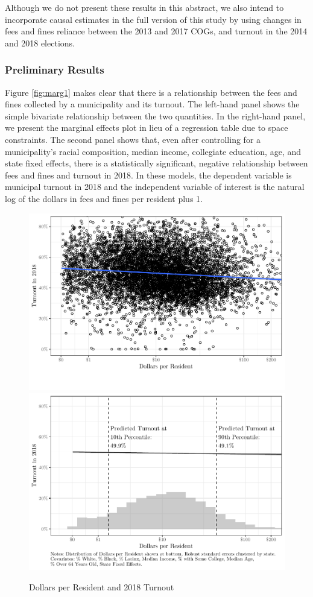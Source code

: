 \documentclass[
  12pt,
]{article}
\begin{document}
Although we do not present these results in this abstract, we also intend to incorporate causal estimates in the full version of this study by using changes in fees and fines reliance between the 2013 and 2017 COGs, and turnout in the 2014 and 2018 elections.

\hypertarget{preliminary-results}{%
\subsubsection*{Preliminary Results}\label{preliminary-results}}

Figure \ref{fig:marg1} makes clear that there is a relationship between the fees and fines collected by a municipality and its turnout. The left-hand panel shows the simple bivariate relationship between the two quantities. In the right-hand panel, we present the marginal effects plot in lieu of a regression table due to space constraints. The second panel shows that, even after controlling for a municipality's racial composition, median income, collegiate education, age, and state fixed effects, there is a statistically significant, negative relationship between fees and fines and turnout in 2018. In these models, the dependent variable is municipal turnout in 2018 and the independent variable of interest is the natural log of the dollars in fees and fines per resident plus 1.

\begin{figure}[H]
\includegraphics[width=0.5\linewidth]{fees_fines_to_files/figure-latex/figures-side-1} \includegraphics[width=0.5\linewidth]{fees_fines_to_files/figure-latex/figures-side-2} \caption{\label{fig:marg1}Dollars per Resident and 2018 Turnout}\label{fig:figures-side}
\end{figure}
\end{document}
